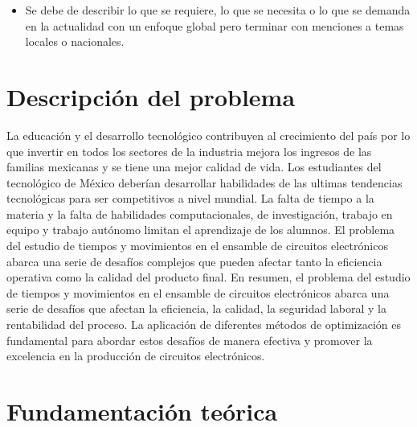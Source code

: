         \begin{itemize}
           \item Se debe de describir lo que se requiere, lo que se necesita o lo que se demanda en la actualidad con un enfoque global pero terminar con menciones a temas locales o nacionales.
        \end{itemize}
    \section{Descripción del problema}
    
    La educación y el desarrollo tecnológico contribuyen al crecimiento del país por lo que invertir en todos los sectores de la industria mejora los ingresos de las familias mexicanas y se tiene una mejor calidad de vida.
    Los estudiantes del tecnológico de México deberían desarrollar habilidades de las ultimas tendencias tecnológicas para ser competitivos a nivel mundial.
    La falta de tiempo a la materia y la falta de habilidades computacionales, de investigación, trabajo en equipo y trabajo autónomo limitan el aprendizaje de los alumnos.
    El problema del estudio de tiempos y movimientos en el ensamble de circuitos electrónicos abarca una serie de desafíos complejos que pueden afectar tanto la eficiencia operativa como la calidad del producto final.
    En resumen, el problema del estudio de tiempos y movimientos en el ensamble de circuitos electrónicos abarca una serie de desafíos que afectan la eficiencia, la calidad, la seguridad laboral y la rentabilidad del proceso. La aplicación de diferentes métodos de optimización es fundamental para abordar estos desafíos de manera efectiva y promover la excelencia en la producción de circuitos electrónicos.
    \section{Fundamentación teórica}
    
